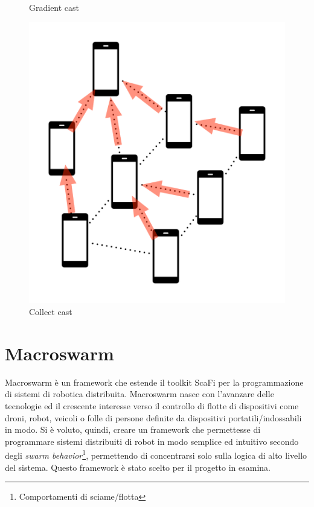 \documentclass[12pt,a4paper,openright,twoside]{book}
\begin{document}
\begin{figure}[H]
\begin{minipage}[b]{0.3\textwidth}
        \caption{Gradient cast}
        \label{fig:gradient-cast}
    \end{minipage}
    \hfill
    \begin{minipage}[b]{0.3\textwidth}
        \includegraphics[width=\textwidth]{figures/collect-cast.pdf}
        \caption{Collect cast}
        \label{fig:collect-cast}
    \end{minipage}
\end{figure}

\section{Macroswarm}

Macroswarm è un framework che estende il toolkit ScaFi  per la programmazione di sistemi di robotica distribuita. Macroswarm nasce con l'avanzare delle tecnologie ed il crescente interesse verso il controllo di flotte di dispositivi come droni, robot, veicoli o folle di persone definite da dispositivi portatili/indossabili in modo.
Si è voluto, quindi, creare un framework che permettesse di programmare sistemi distribuiti di robot in modo semplice ed intuitivo secondo degli \textit{swarm behavior}\footnote{Comportamenti di sciame/flotta}, permettendo di concentrarsi solo sulla logica di alto livello del sistema. Questo framework è stato scelto per il progetto in esamina.
\end{document}
